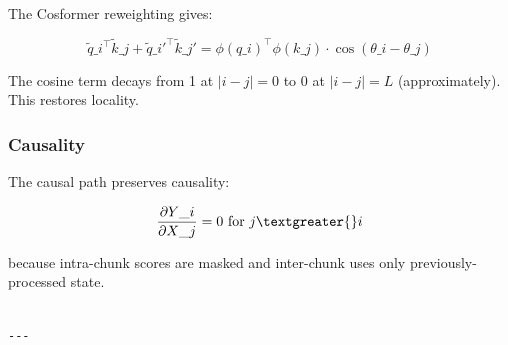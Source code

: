 The Cosformer reweighting gives:

\[
\tilde{q}\_i^\top \tilde{k}\_j + \tilde{q}\_i'^\top \tilde{k}\_j' = \phi(q\_i)^\top \phi(k\_j) \cdot \cos(\theta\_i - \theta\_j)
\]

The cosine term decays from 1 at $|i - j| = 0$ to 0 at $|i - j| = L$ 
(approximately). This restores locality.

\subsubsection{Causality}

The causal path preserves causality:

\[
\frac{\partial Y\_i}{\partial X\_j} = 0 \text{ for } j \textgreater{} i
\]

because intra-chunk scores are masked and inter-chunk uses only 
previously-processed state.
\begin{lstlisting}

---
\end{lstlisting}